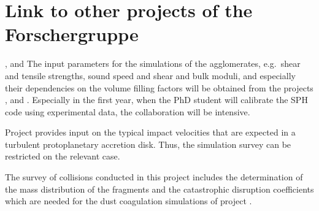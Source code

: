 \section{Link to other projects of the Forschergruppe}
\begin{linkproj}
\item[\projblum{}, \projwurm{} and \projblumtrie{}] The input parameters
for the simulations of the agglomerates,
e.g.~shear and tensile strengths, sound speed and shear and bulk moduli,
and especially their dependencies on the volume filling factors will  
be obtained from the projects
\projblum{}, \projwurm{} and \projblumtrie{}. Especially in the first
year, when the PhD student will calibrate the SPH code using
experimental data, the collaboration will be intensive.
\item[\projklahr{}] Project \projklahr{} provides input on the typical
impact velocities that are expected in a turbulent protoplanetary
accretion disk. Thus, the simulation survey can be restricted on the
relevant case.
\item[\projdul{}] The survey of collisions conducted in
this project includes the determination of the mass distribution of the
fragments and the catastrophic disruption coefficients which are  
needed for the dust coagulation
simulations of project \projdul{}.
\end{linkproj}



